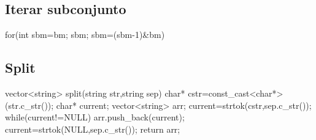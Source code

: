 \subsection*{Iterar subconjunto}
\begin{code}
for(int sbm=bm; sbm; sbm=(sbm-1)&bm)
\end{code}
\subsection*{Split}
\begin{code}
vector<string> split(string str,string sep){
    char* cstr=const_cast<char*>(str.c_str());
    char* current;
    vector<string> arr;
    current=strtok(cstr,sep.c_str());
    while(current!=NULL){
        arr.push_back(current);
        current=strtok(NULL,sep.c_str());
    }
    return arr;
}
\end{code}

